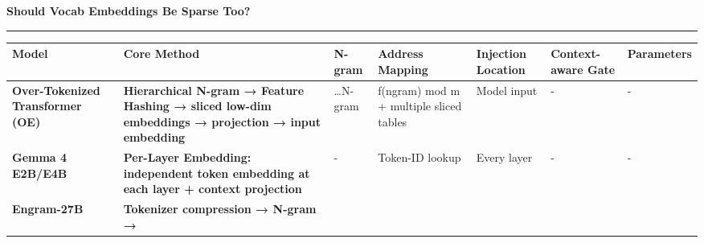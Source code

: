 \documentclass[
  11pt,
  a4paper,
]{article}
\author{}
\date{}
\newcounter{none} %
\newcommand{\NotesCover}[1]{%
  \pagenumbering{roman}%
  \thispagestyle{empty}%
  \vspace*{0mm}%
  {\centering
    \sffamily\bfseries\color{attentionblue}%
    \fontsize{26pt}{36pt}\selectfont #1\par
  }%
  \vspace{4mm}%
  {\color{attentionblue}\noindent\rule{\linewidth}{0.6pt}\par}%
  \vspace{4mm}%
  \begingroup
    \setlength{\parindent}{0pt}%
    \setlength{\parskip}{0.6em}%
    \tableofcontents
  \endgroup
}
\newcommand{\OverviewTableStyle}{%
  \linespread{1}\fontsize{8.5pt}{10.5pt}\selectfont
  \setlength{\tabcolsep}{2.5pt}%
  \renewcommand{\arraystretch}{1.15}%
  \setlength{\extrarowheight}{6pt}%
  \setlength{\LTpre}{22pt}%
  \setlength{\LTpost}{0pt}%
  \setlength{\parskip}{0pt}%
}
\begin{document}
\NotesCover{Should Vocab Embeddings Be Sparse Too?}

\begingroup\OverviewTableStyle

{\def\LTcaptype{none} %
\begin{longtable}[]{@{}
  >{\centering\arraybackslash}p{}
  >{\centering\arraybackslash}p{}
  >{\centering\arraybackslash}p{}
  >{\centering\arraybackslash}p{}
  >{\centering\arraybackslash}p{}
  >{\centering\arraybackslash}p{}
  >{\centering\arraybackslash}p{}@{}}
\toprule\noalign{}
\begin{minipage}[b]{\linewidth}\centering
\textbf{Model}
\end{minipage} & \begin{minipage}[b]{\linewidth}\centering
\textbf{Core Method}
\end{minipage} & \begin{minipage}[b]{\linewidth}\centering
\textbf{N-gram}
\end{minipage} & \begin{minipage}[b]{\linewidth}\centering
\textbf{Address Mapping}
\end{minipage} & \begin{minipage}[b]{\linewidth}\centering
\textbf{Injection Location}
\end{minipage} & \begin{minipage}[b]{\linewidth}\centering
\textbf{Context-aware Gate}
\end{minipage} & \begin{minipage}[b]{\linewidth}\centering
\textbf{Parameters}
\end{minipage} \\
\midrule\noalign{}
\endhead
\bottomrule\noalign{}
\endlastfoot
\textbf{Over-Tokenized Transformer (OE)} & \textbf{Hierarchical N-gram →
Feature Hashing → sliced low-dim embeddings → projection → input
embedding} & 1\ldots N-gram & f(ngram) mod m + multiple sliced tables &
Model input & - & - \\
\textbf{Gemma 4 E2B/E4B} & \textbf{Per-Layer Embedding: independent
token embedding at each layer + context projection} & - & Token-ID
lookup & Every layer & - & - \\
\textbf{Engram-27B} & \textbf{Tokenizer compression → N-gram →
}
\end{longtable}}
\end{document}
